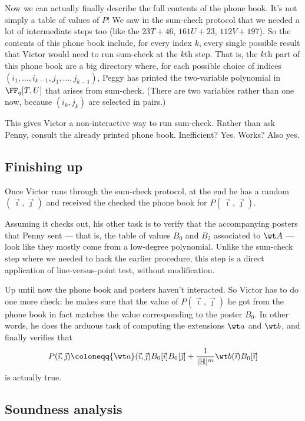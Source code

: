 \documentclass[11pt]{scrreprt}
\newcommand{\HH}{\mathbb H}
\begin{document}
Now we can actually finally describe the full contents of the phone book.
It's not simply a table of values of $P$!
We saw in the sum-check protocol that we needed a lot of intermediate steps too
(like the $23T+46$, $161U+23$, $112V+197$).
So the contents of this phone book include, for every index $k$,
every single possible result that Victor would need to run sum-check at the $k$th step.
That is, the $k$th part of this phone book are a big directory where,
for each possible choice of indices $(i_1, \dots, i_{k-1}, j_1, \dots, j_{k-1})$,
Peggy has printed the two-variable polynomial in $\FF_q[T,U]$ that arises from sum-check.
(There are two variables rather than one now,
because $(i_k, j_k)$ are selected in pairs.)

This gives Victor a non-interactive way to run sum-check.
Rather than ask Penny, consult the already printed phone book.
Inefficient? Yes. Works? Also yes.

\subsection{Finishing up}
Once Victor runs through the sum-check protocol,
at the end he has a random $(\vec\imath, \vec\jmath)$ and received
the checked the phone book for $P(\vec\imath, \vec\jmath)$.

Assuming it checks out, his other task is to
verify that the accompanying posters that Penny sent ---
that is, the table of values $B_0$ and $B_2$ associated to $\wt A$ ---
look like they mostly come from a low-degree polynomial.
Unlike the sum-check step where we needed to hack the earlier procedure,
this step is a direct application of line-versus-point test, without modification.

Up until now the phone book and posters haven't interacted.
So Victor has to do one more check:
he makes sure that the value of $P(\vec\imath, \vec\jmath)$ he got from the phone book
in fact matches the value corresponding to the poster $B_0$.
In other words, he does the arduous task of computing the extensions
$\wt a$ and $\wt b$, and finally verifies that
\[
  P(\vec\imath, \vec\jmath) \coloneqq
  {\wt a}(\vec\imath, \vec\jmath) B_0[\vec\imath] B_0[\vec\jmath]
  + \frac{1}{|\HH|^m} \wt b(\vec\imath) B_0[\vec\imath]
\]
is actually true.

\subsection{Soundness analysis}
\end{document}
